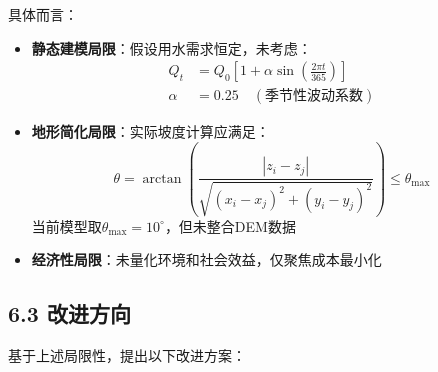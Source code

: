 \documentclass[12pt,a4paper]{article}
\begin{document}
具体而言：
\begin{itemize}
  \item \textbf{静态建模局限}：假设用水需求恒定，未考虑：
  \begin{align*}
    Q_t &= Q_0 \left[1 + \alpha\sin\left(\frac{2\pi t}{365}\right)\right] \\
    \alpha &= 0.25 \quad (\text{季节性波动系数})
  \end{align*}
  
  \item \textbf{地形简化局限}：实际坡度计算应满足：
  \[
  \theta = \arctan\left(\frac{|z_i - z_j|}{\sqrt{(x_i-x_j)^2 + (y_i-y_j)^2}}\right) \leq \theta_{\max}
  \]
  当前模型取$\theta_{\max}=10^\circ$，但未整合DEM数据\\
  
  \item \textbf{经济性局限}：未量化环境和社会效益，仅聚焦成本最小化
\end{itemize}

\subsection*{6.3 改进方向}
基于上述局限性，提出以下改进方案：
\end{document}

